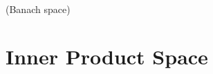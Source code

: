 \begin{definition}
(Banach space)
\end{definition}

\section{Inner Product Space}

\begin{definition}
\end{definition}

\begin{definition}
\end{definition}







